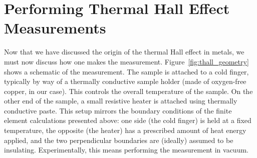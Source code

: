 \documentclass{thesis-umich}
\begin{document}
\section{Performing Thermal Hall Effect Measurements}
Now that we have discussed the origin of the thermal Hall effect in metals, we
must now discuss how one makes the measurement. Figure~\ref{fig:thall_geometry}
shows a schematic of the measurement. The sample is attached to a cold finger,
typically by way of a thermally conductive sample holder (made of oxygen-free
copper, in our case). This controls the overall temperature of the sample. On the other end of the sample, a small resistive heater is attached using thermally conductive paste. This setup mirrors the boundary conditions of the finite element calculations presented above: one side (the cold finger) is held at a fixed temperature, the opposite (the heater) has a prescribed amount of heat energy applied, and the two perpendicular boundaries are (ideally) assumed to be insulating. Experimentally, this means performing the measurement in vacuum.
\end{document}
